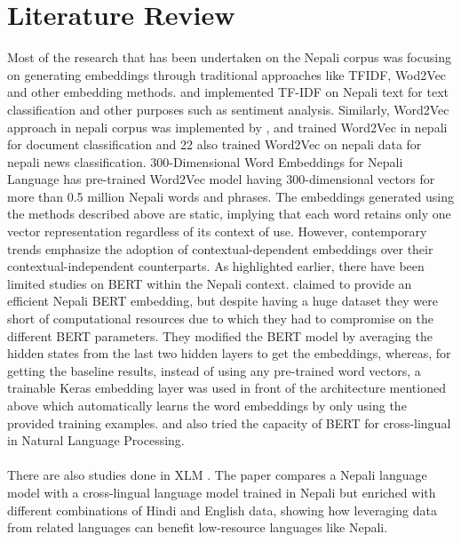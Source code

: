 \chapter{Literature Review}
Most of the research that has been undertaken on the Nepali corpus was focusing on generating embeddings through traditional approaches like TFIDF, Wod2Vec and other embedding methods. \cite{Bhatta_Shrestha_Nepal_Pandey_Koirala_2020} \cite{Singh2019NepaliMT} \cite{shahi2018nepali} and \cite{ghosh2018class} implemented TF-IDF on Nepali text for text classification and other purposes such as sentiment analysis. Similarly, Word2Vec approach in nepali 
corpus was implemented by \cite{lamsal2019300},\cite{bhatta2020efficient} and \cite{basnet2018improving} trained Word2Vec in nepali for document classification and 22 also trained Word2Vec on nepali data for nepali news classification. 300-Dimensional Word Embeddings for Nepali Language \cite{300D} has pre-trained Word2Vec model having 300-dimensional vectors for more than 0.5 million Nepali words and phrases. The embeddings generated using the methods described above are static, implying that each word retains only one vector representation regardless of its context of use. However, contemporary trends emphasize the adoption of contextual-dependent embeddings over their contextual-independent counterparts. As highlighted earlier, there have been limited studies on BERT within the Nepali context. \cite{koirala-niraula-2021-npvec1} claimed to provide an efficient Nepali BERT embedding, but despite having a huge dataset they were short of computational resources due to which they had to compromise on the different BERT parameters. They modified the BERT model by averaging the hidden states from the last two hidden layers to get the embeddings, whereas, for getting the baseline results, instead of using any pre-trained word vectors, a trainable Keras embedding layer was used in front of the architecture mentioned above which automatically learns the word embeddings by only using the provided training examples. \cite{rajan_nepalibert_2021} and  \cite{milanmg_bert-nepali_2022} also tried the capacity of BERT for cross-lingual in Natural Language Processing. \\\\
There are also studies done in XLM \cite{NEURIPS2019_c04c19c2}. The paper compares a Nepali language model with a cross-lingual language model trained in Nepali but enriched with different combinations of Hindi and English data, showing how leveraging data from related languages can benefit low-resource languages like Nepali.
